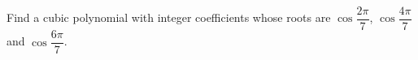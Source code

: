 Find a cubic polynomial with integer coefficients whose roots are $\cos\dfrac{2\pi}7$, $\cos\dfrac{4\pi}7$ and $\cos\dfrac{6\pi}7$.
